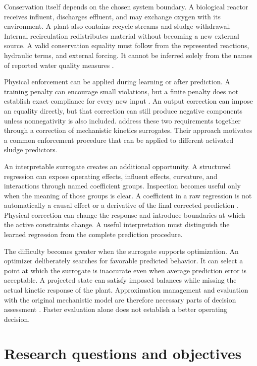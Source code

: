 Conservation itself depends on the chosen system boundary. A biological reactor receives influent, discharges effluent, and may exchange oxygen with its environment. A plant also contains recycle streams and sludge withdrawal. Internal recirculation redistributes material without becoming a new external source. A valid conservation equality must follow from the represented reactions, hydraulic terms, and external forcing. It cannot be inferred solely from the names of reported water quality measures \citep{Henze2006,SturmWexler2020}.

Physical enforcement can be applied during learning or after prediction. A training penalty can encourage small violations, but a finite penalty does not establish exact compliance for every new input \citep{Raissi2019,Hansen2024}. An output correction can impose an equality directly, but that correction can still produce negative components unless nonnegativity is also included. \citet{KircherVotsmeier2025} address these two requirements together through a correction of mechanistic kinetics surrogates. Their approach motivates a common enforcement procedure that can be applied to different activated sludge predictors.

An interpretable surrogate creates an additional opportunity. A structured regression can expose operating effects, influent effects, curvature, and interactions through named coefficient groups. Inspection becomes useful only when the meaning of those groups is clear. A coefficient in a raw regression is not automatically a causal effect or a derivative of the final corrected prediction \citep{Rudin2019,Brunton2016}. Physical correction can change the response and introduce boundaries at which the active constraints change. A useful interpretation must distinguish the learned regression from the complete prediction procedure.

The difficulty becomes greater when the surrogate supports optimization. An optimizer deliberately searches for favorable predicted behavior. It can select a point at which the surrogate is inaccurate even when average prediction error is acceptable. A projected state can satisfy imposed balances while missing the actual kinetic response of the plant. Approximation management and evaluation with the original mechanistic model are therefore necessary parts of decision assessment \citep{Alexandrov1998,Pedrozo2025}. Faster evaluation alone does not establish a better operating decision.

\section{Research questions and objectives}

